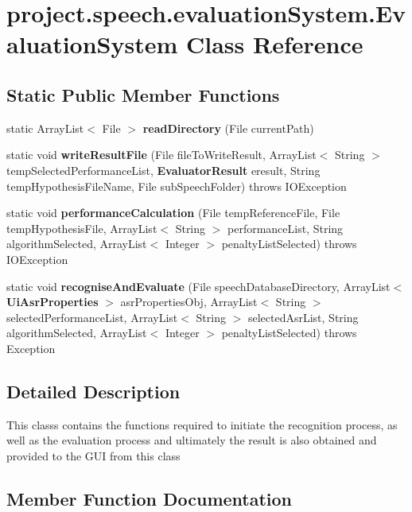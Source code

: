 \section{project.\+speech.\+evaluation\+System.\+Evaluation\+System Class Reference}
\label{classproject_1_1speech_1_1evaluation_system_1_1_evaluation_system}
\subsection*{Static Public Member Functions}
\begin{DoxyCompactItemize}
\item 
static Array\+List$<$ File $>$ {\bf read\+Directory} (File current\+Path)
\item 
static void {\bf write\+Result\+File} (File file\+To\+Write\+Result, Array\+List$<$ String $>$ temp\+Selected\+Performance\+List, {\bf Evaluator\+Result} eresult, String temp\+Hypothesis\+File\+Name, File sub\+Speech\+Folder)  throws I\+O\+Exception
\item 
static void {\bf performance\+Calculation} (File temp\+Reference\+File, File temp\+Hypothesis\+File, Array\+List$<$ String $>$ performance\+List, String algorithm\+Selected, Array\+List$<$ Integer $>$ penalty\+List\+Selected)  throws I\+O\+Exception 
\item 
static void {\bf recognise\+And\+Evaluate} (File speech\+Database\+Directory, Array\+List$<$ {\bf Ui\+Asr\+Properties} $>$ asr\+Properties\+Obj, Array\+List$<$ String $>$ selected\+Performance\+List, Array\+List$<$ String $>$ selected\+Asr\+List, String algorithm\+Selected, Array\+List$<$ Integer $>$ penalty\+List\+Selected)  throws Exception 
\end{DoxyCompactItemize}


\subsection{Detailed Description}
This classs contains the functions required to initiate the recognition process, as well as the evaluation process and ultimately the result is also obtained and provided to the G\+U\+I from this class 

\subsection{Member Function Documentation}
